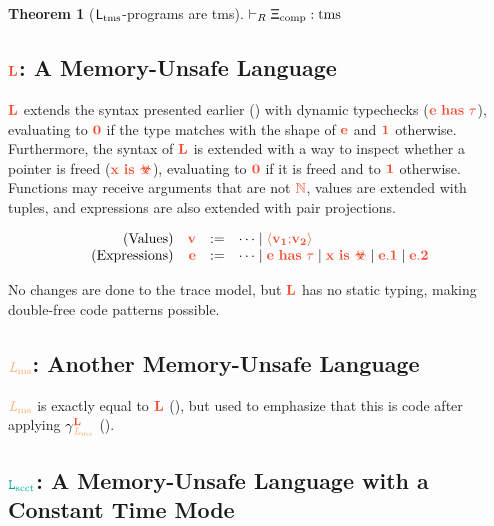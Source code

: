 \documentclass[acmsmall]{acmart}
\theoremstyle{definition}
\newtheorem{theorem}{Theorem}[section]
\begin{document}
\begin{theorem}[$\mathsf{L_{\operatorname{tms}}}$-programs are \gls*{tms}]\label{thm:wt:tms}
$\vdash_R{\mathsf{\Xi_{\text{comp}}}}:{\operatorname{tms}}$ \Coqed
% 
\end{theorem}

\subsection{$\Ltrg$: A Memory-Unsafe Language}\label{subsec:lsms}

$\Ltrg$ extends the syntax presented earlier () with dynamic typechecks ($\trg{\lhast{\expr}{\type}}$), evaluating to $\trg{0}$ if the type matches with the shape of $\trg{\expr}$ and $\trg{1}$ otherwise.
Furthermore, the syntax of $\Ltrg$ is extended with a way to inspect whether a pointer is freed ($\trg{\lispoisoned{x}}$), evaluating to $\trg{0}$ if it is freed and to $\trg{1}$ otherwise.
Functions may receive arguments that are not $\trg{\natt}$, values are extended with tuples, and expressions are also extended with pair projections.

\[
  \begin{array}{rrcl}
    \text{(Values)} & \trg{v} &:=& \dots \mid \trg{\lpair{v_1}{v_2}} \\
    \text{(Expressions)} & \trg{\expr} &:=& \dots \mid \trg{\lhast{\expr}{\tau}} \mid \trg{\lispoisoned{x}} \mid \trg{e.1} \mid \trg{e.2}
  \end{array}
\]

No changes are done to the trace model, but $\Ltrg$ has no static typing, making double-free code patterns possible.

\subsection{$\Lms$: Another Memory-Unsafe Language}\label{subsec:lms}
$\Lms$ is exactly equal to $\Ltrg$ (), but used to emphasize that this is code after applying $\cc{\Ltrg}{\Lms}$ ().

\subsection{$\Lscct$: A Memory-Unsafe Language with a Constant Time Mode}\label{subsec:lscct}
\end{document}
